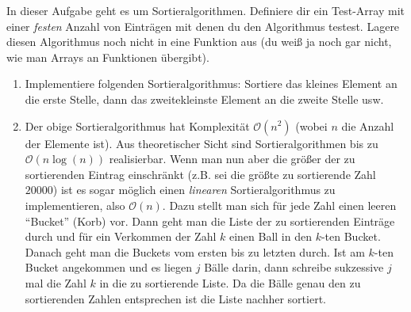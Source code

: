 \documentclass{uebungszettel}
\begin{document}
\begin{aufg} In dieser Aufgabe geht es um Sortieralgorithmen. Definiere dir ein Test-Array mit einer \emph{festen} 
Anzahl von Einträgen mit denen du den Algorithmus testest. Lagere diesen Algorithmus noch nicht in eine Funktion aus 
(du weiß ja noch gar nicht, wie man Arrays an Funktionen übergibt).
\begin{enumerate} 
\item Implementiere folgenden Sortieralgorithmus: Sortiere das kleines Element an die erste Stelle, dann das 
zweitekleinste Element an die zweite Stelle usw.
\item Der obige Sortieralgorithmus hat Komplexität $\mathcal O(n^2)$ (wobei $n$ die Anzahl der Elemente ist). Aus 
theoretischer Sicht sind Sortieralgorithmen bis zu $\mathcal O(n \log(n))$ realisierbar. Wenn man nun aber die größer 
der zu sortierenden Eintrag einschränkt (z.B. sei die größte zu sortierende Zahl $20000$) ist es sogar möglich einen 
\emph{linearen} Sortieralgorithmus zu implementieren, also $\mathcal O(n)$. Dazu stellt man sich für jede Zahl einen 
leeren ``Bucket'' (Korb) vor. Dann geht man die Liste der zu sortierenden Einträge durch und für ein Verkommen der Zahl 
$k$ einen Ball in den $k$-ten Bucket. Danach geht man die Buckets vom ersten bis zu letzten durch. Ist am $k$-ten 
Bucket angekommen und es liegen $j$ Bälle darin, dann schreibe sukzessive $j$ mal die Zahl $k$ in die zu sortierende 
Liste. Da die Bälle genau den zu sortierenden Zahlen entsprechen ist die Liste nachher sortiert. 
\end{enumerate}
\end{aufg}
\end{document}
